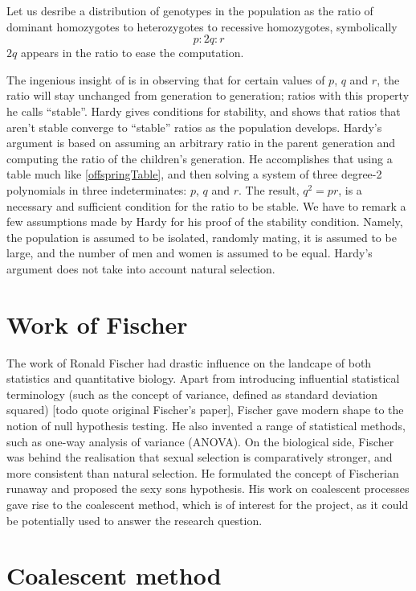 \documentclass{l4proj}
\begin{document}
\begin{samepage}
Let us desribe a distribution of genotypes in the population as the ratio of dominant homozygotes to heterozygotes to recessive homozygotes, symbolically $$p:2q:r$$ $2q$ appears in the ratio to ease the computation.
\end{samepage}

The ingenious insight of \cite{hardy08} is in observing that for certain values of $p$, $q$ and $r$, the ratio will stay unchanged from generation to generation; ratios with this property he calls ``stable''. Hardy gives conditions for stability, and shows that ratios that aren't stable converge to ``stable'' ratios as the population develops. Hardy's argument is based on assuming an arbitrary ratio in the parent generation and computing the ratio of the children's generation. He accomplishes that using a table much like \ref{offspringTable}, and then solving a system of three degree-2 polynomials in three indeterminates: $p$, $q$ and $r$. The result, $q^{2}=pr$, is a necessary and sufficient condition for the ratio to be stable. We have to remark a few assumptions made by Hardy for his proof of the stability condition. Namely, the population is assumed to be isolated, randomly mating, it is assumed to be large, and the number of men and women is assumed to be equal. Hardy's argument does not take into account natural selection.

\section{Work of Fischer}

The work of Ronald Fischer had drastic influence on the landcape of both statistics and quantitative biology. Apart from introducing influential statistical terminology (such as the concept of variance, defined as standard deviation squared) [todo quote original Fischer's paper], Fischer gave modern shape to the notion of null hypothesis testing. He also invented a range of statistical methods, such as one-way analysis of variance (ANOVA). On the biological side, Fischer was behind the realisation that sexual selection is comparatively stronger, and more consistent than natural selection. He formulated the concept of Fischerian runaway and proposed the sexy sons hypothesis. His work on coalescent processes gave rise to the coalescent method, which is of interest for the project, as it could be potentially used to answer the research question.

\section{Coalescent method}
\end{document}
